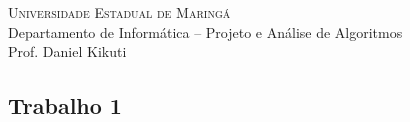 \documentclass[a4paper]{exam}
\begin{document}
\printanswers

\begin{center}
\begin{minipage}[c][1.5cm][c]{1.5cm}
\end{minipage}
\begin{minipage}[c][1.5cm][c]{12cm} 
\textsc{\Large Universidade Estadual de Maringá} \\
Departamento de Informática -- Projeto e Análise de Algoritmos \\
Prof. Daniel Kikuti
\end{minipage}
\end{center}

\begin{center}
\section*{Trabalho 1}
\end{center}

\bracketedpoints
\pointname{}
\end{document}
